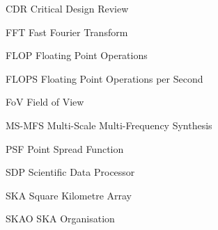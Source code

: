 \documentclass[11pt,a4paper,variablewidth]{article}
\begin{document}
\tccfrontpage

\sdptableofcontents

\sdplistofabbreviations
\begin{basedescript}{\desclabelstyle{\pushlabel}\desclabelwidth{6em}}
    \item[CDR] Critical Design Review \vspace{-0.2cm}
    \item[FFT] Fast Fourier Transform\vspace{-0.2cm}
    \item[FLOP] Floating Point Operations \vspace{-0.2cm}
    \item[FLOPS] Floating Point Operations per Second \vspace{-0.2cm}
    \item[FoV] Field of View\vspace{-0.2cm}
    \item[MS-MFS] Multi-Scale Multi-Frequency Synthesis\vspace{-0.2cm}
    \item[PSF] Point Spread Function \vspace{-0.2cm}
    \item[SDP] Scientific Data Processor\vspace{-0.2cm}
    \item[SKA] Square Kilometre Array\vspace{-0.2cm}
    \item[SKAO] SKA Organisation\vspace{-0.2cm}
\end{basedescript} 

\newcommand{\nuno}{{\left(\frac{\nu}{\nu_0}\right)}}
\newcommand{\dnuno}{{\left(\frac{\nu-\nu_0}{\nu_0}\right)}}

\newcommand{\dg}{^\dag}
\newcommand{\X}{\vec{x}}
\newcommand{\Xd}{\vec{{x}^\dag}}
\newcommand{\B}{\vec{b}}
\newcommand{\Bd}{\vec{b^\dag}}
\newcommand{\V}{\vec{V}}
\newcommand{\Vd}{\vec{V^\dag}}
\newcommand{\A}{{\tens{A}{}}}
\newcommand{\Ad}{{\tens{A^\dag}{}}}
\newcommand{\F}{{\tens{F}{s}}}
\newcommand{\Fd}{{\tens{F^\dag}{}}}
\newcommand{\He}{{\tens{H}{}}}
\newcommand{\Sa}{{\tens{S}{}}}
\newcommand{\Sd}{{\tens{S^\dag}{}}}
\newcommand{\Sna}{\tens{{S_{\nu}}{}}}
\newcommand{\Snd}{\tens{{S_{\nu}^\dag}{}}}
\newcommand{\T}{{\tens{T}{}}}
\newcommand{\W}{{\tens{W}{}}}
\newcommand{\Wd}{{\tens{W^\dag}{}}}
\newcommand{\Pb}{{\vec{P}}}
\end{document}
